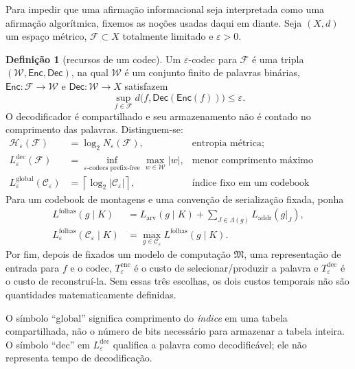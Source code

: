 \documentclass[11pt,a4paper]{article}
\theoremstyle{definition}
\newtheorem{definition}[theorem]{Definição}
\theoremstyle{remark}
\begin{document}
Para impedir que uma afirmação informacional seja interpretada como uma
afirmação algorítmica, fixemos as noções usadas daqui em diante. Seja
$(X,d)$ um espaço métrico, $\mathcal F\subset X$ totalmente limitado e
$\varepsilon>0$.

\begin{definition}[recursos de um codec]\label{def:coding-resources}
Um $\varepsilon$-codec para $\mathcal F$ é uma tripla
$(\mathcal W,\mathsf{Enc},\mathsf{Dec})$, na qual $\mathcal W$ é um conjunto
finito de palavras binárias, $\mathsf{Enc}:\mathcal F\to\mathcal W$ e
$\mathsf{Dec}:\mathcal W\to X$ satisfazem
\[
 \sup_{f\in\mathcal F}d\bigl(f,\mathsf{Dec}(\mathsf{Enc}(f))\bigr)
 \le\varepsilon.
\]
O decodificador é compartilhado e seu armazenamento não é contado no
comprimento das palavras. Distinguem-se:
\begin{align*}
 \mathcal H_\varepsilon(\mathcal F)
  &=\log_2N_\varepsilon(\mathcal F),
  &&\text{entropia métrica;}\\
 L_\varepsilon^{\mathrm{dec}}(\mathcal F)
  &=\inf_{\text{$\varepsilon$-codecs prefix-free}}
    \max_{w\in\mathcal W}|w|,
  &&\text{menor comprimento máximo decodificável;}\\
 L_\varepsilon^{\mathrm{global}}(\mathcal C_\varepsilon)
  &=\left\lceil\log_2|\mathcal C_\varepsilon|\right\rceil,
  &&\text{índice fixo em um codebook compartilhado.}
\end{align*}
Para um codebook de montagens e uma convenção de serialização fixada, ponha
\begin{align*}
 L^{\mathrm{folhas}}(g\mid K)
   &=L_{\mathrm{arv}}(g\mid K)
     +\sum_{J\in\Lambda(g)}L_{\mathrm{addr}}(g|_J),\\
 L_\varepsilon^{\mathrm{folhas}}(\mathcal C_\varepsilon\mid K)
   &=\max_{g\in\mathcal C_\varepsilon}L^{\mathrm{folhas}}(g\mid K).
\end{align*}
Por fim, depois de fixados um modelo de computação $\mathfrak M$, uma
representação de entrada para $f$ e o codec, $T_\varepsilon^{\mathrm{enc}}$
é o custo de selecionar/produzir a palavra e $T_\varepsilon^{\mathrm{dec}}$ é
o custo de reconstruí-la. Sem essas três escolhas, os dois custos temporais
não são quantidades matematicamente definidas.
\end{definition}

O símbolo ``global'' significa comprimento do \emph{índice} em uma tabela
compartilhada, não o número de bits necessário para armazenar a tabela inteira.
O símbolo ``dec'' em $L_\varepsilon^{\mathrm{dec}}$ qualifica a palavra como
decodificável; ele não representa tempo de decodificação.
\end{document}
